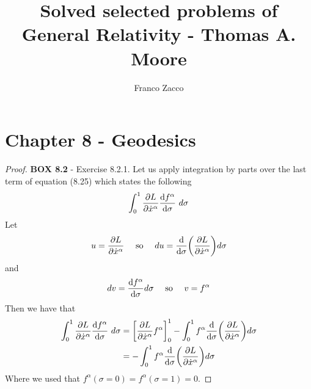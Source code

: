 \documentclass[11pt]{article}
\title{\textbf{Solved selected problems of General Relativity - Thomas A. Moore}}
\author{Franco Zacco}
\date{}
\theoremstyle{definition}
\begin{document}
\maketitle
\thispagestyle{empty}

\section*{Chapter 8 - Geodesics}

\begin{proof}{\textbf{BOX 8.2} - Exercise 8.2.1.}
    Let us apply integration by parts over the last term of equation (8.25)
    which states the following
    \begin{align*}
        \int_{0}^1 \partialderivative{L}{\dot{x}^\alpha}\derivative{f^\alpha}{\sigma}~d\sigma
    \end{align*}
    Let
    \begin{align*}
        u = \partialderivative{L}{\dot{x}^\alpha}
        \quad\text{ so }\quad
        du = \derivative{}{\sigma}\bigg(\partialderivative{L}{\dot{x}^\alpha}\bigg)d\sigma
    \end{align*}
    and 
    \begin{align*}
        dv = \derivative{f^\alpha}{\sigma}d\sigma
        \quad\text{ so }\quad
        v = f^\alpha
    \end{align*}
    Then we have that
    \begin{align*}
        \int_{0}^1 \partialderivative{L}{\dot{x}^\alpha}\derivative{f^\alpha}{\sigma}~d\sigma
        &= \bigg[\partialderivative{L}{\dot{x}^\alpha}f^\alpha\bigg]_0^1
        - \int_0^1 f^\alpha \derivative{}{\sigma}\bigg(
            \partialderivative{L}{\dot{x}^\alpha}
        \bigg)d\sigma\\
        &= - \int_0^1 f^\alpha \derivative{}{\sigma}\bigg(
            \partialderivative{L}{\dot{x}^\alpha}
        \bigg)d\sigma
    \end{align*}
    Where we used that $f^\alpha(\sigma = 0) = f^\alpha(\sigma = 1) = 0$.
\end{proof}
\cleardoublepage
\end{document}
